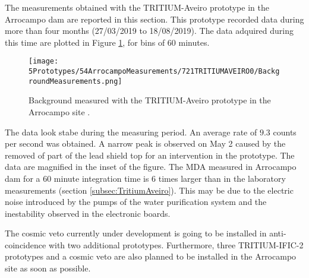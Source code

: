 
The measurements obtained with the TRITIUM-Aveiro prototype in the Arrocampo dam are reported in this section. This prototype recorded data during more than four months (27/03/2019 to 18/08/2019). The data adquired during this time are plotted in Figure \ref{fig:BackgroundArrocampoAveiro}, for bins of 60 minutes.
\begin{figure}[h]
\centering
\texttt{[image: 5Prototypes/54ArrocampoMeasurements/721TRITIUMAVEIRO0/BackgroundMeasurements.png]}
\caption{Background measured with the TRITIUM-Aveiro prototype in the Arrocampo site \cite{ExperimentalPaperCarlos}.\label{fig:BackgroundArrocampoAveiro}}
\end{figure}
The data look stabe during the measuring period. An average rate of $9.3$ counts per second was obtained. A narrow peak is observed on May 2 caused by the removed of part of the lead shield top for an intervention in the prototype. The data are magnified in the inset of the figure. The MDA measured in Arrocampo dam for a 60 minute integration time is 6 times larger than in the laboratory measurements (section \ref{subsec:TritiumAveiro}). This may be due to the electric noise introduced by the pumps of the water purification system and the inestability observed in the electronic boards.

The cosmic veto currently under development is going to be installed in anti-coincidence with two additional prototypes. Furthermore, three TRITIUM-IFIC-2 prototypes and a cosmic veto are also planned to be installed in the Arrocampo site as soon as possible.